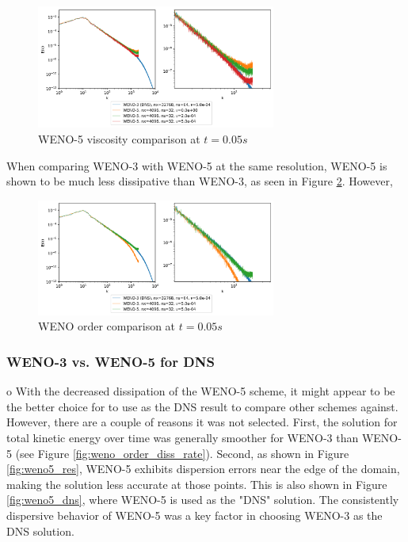 \documentclass[conf]{new-aiaa}
\begin{document}
\begin{figure}[hbt!]
	\centering
	\includegraphics[width=0.7\textwidth]{figures/WENO5_Viscosity_Comparison_Ek_vs_k.png}
	\caption{WENO-5 viscosity comparison at $t=0.05s$}
	\label{fig:weno5_vis}
\end{figure}

When comparing WENO-3 with WENO-5 at the same resolution, WENO-5 is shown to be
much less dissipative than WENO-3, as seen in Figure \ref{fig:weno_order}.
However, 

\begin{figure}[hbt!]
	\centering
	\includegraphics[width=0.7\textwidth]{figures/WENO_Order_Comparison_Ek_vs_k.png}
	\caption{WENO order comparison at $t=0.05s$}
	\label{fig:weno_order}
\end{figure}

\subsubsection{WENO-3 vs. WENO-5 for DNS} \label{sec:dns_type}o
With the decreased dissipation of the WENO-5 scheme, it might appear to be the
better choice for to use as the DNS result to compare other schemes against.
However, there are a couple of reasons it was not selected. First, the solution
for total kinetic energy over time was generally smoother for WENO-3 than
WENO-5 (see Figure \ref{fig:weno_order_diss_rate}). Second, as shown in Figure
\ref{fig:weno5_res}, WENO-5 exhibits dispersion errors near the edge of the
domain, making the solution less accurate at those points. This is also shown
in Figure \ref{fig:weno5_dns}, where WENO-5 is used as the "DNS" solution. The
consistently dispersive behavior of WENO-5 was a key factor in choosing WENO-3
as the DNS solution.
\end{document}
